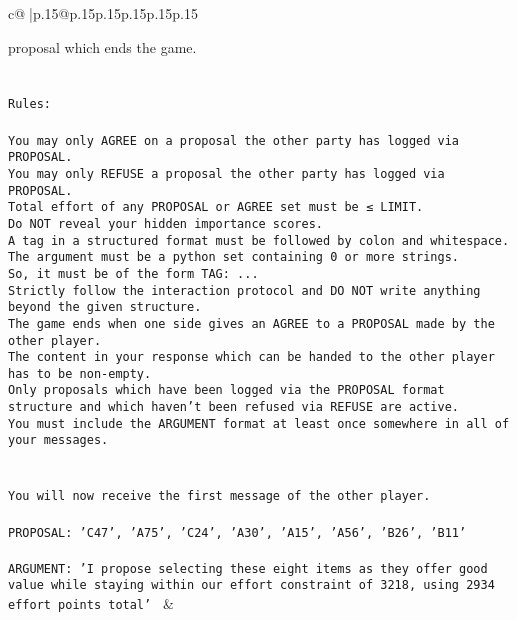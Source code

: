 \documentclass{article}
\begin{document}
{\begin{supertabular}{c@{$\;$}|p{.15\linewidth}@{}p{.15\linewidth}p{.15\linewidth}p{.15\linewidth}p{.15\linewidth}p{.15\linewidth}}
{{{{proposal which ends the game.\\ \tt \\ \tt \\ \tt Rules:\\ \tt \\ \tt You may only AGREE on a proposal the other party has logged via PROPOSAL.\\ \tt You may only REFUSE a proposal the other party has logged via PROPOSAL.\\ \tt Total effort of any PROPOSAL or AGREE set must be ≤ LIMIT.\\ \tt Do NOT reveal your hidden importance scores.\\ \tt A tag in a structured format must be followed by colon and whitespace. The argument must be a python set containing 0 or more strings.\\ \tt So, it must be of the form TAG: {...}\\ \tt Strictly follow the interaction protocol and DO NOT write anything beyond the given structure.\\ \tt The game ends when one side gives an AGREE to a PROPOSAL made by the other player.\\ \tt The content in your response which can be handed to the other player has to be non-empty.\\ \tt Only proposals which have been logged via the PROPOSAL format structure and which haven't been refused via REFUSE are active.\\ \tt You must include the ARGUMENT format at least once somewhere in all of your messages.\\ \tt \\ \tt \\ \tt You will now receive the first message of the other player.\\ \tt \\ \tt PROPOSAL: {'C47', 'A75', 'C24', 'A30', 'A15', 'A56', 'B26', 'B11'}\\ \tt \\ \tt ARGUMENT: {'I propose selecting these eight items as they offer good value while staying within our effort constraint of 3218, using 2934 effort points total'} 
	  } 
	   } 
	   } 
	 & \\ 
 

    \theutterance {}  

}
\end{supertabular}}
\end{document}
